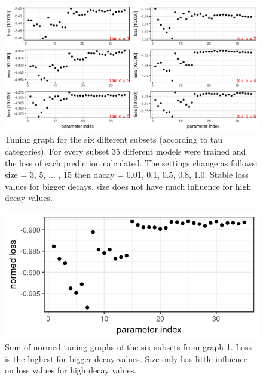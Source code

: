 \documentclass[a4paper,12pt]{article}
\begin{document}
\begin{figure}
 \includegraphics[width=\textwidth]{pictures/nnet_tuning.png}
 \caption{Tuning graph for the six different subsets (according to tau categories). For every subset 35 different models were trained and the loss of each prediction calculated. The settings change as follows: size = 3, 5, ... , 15 then dacay = 0.01, 0.1, 0.5, 0.8, 1.0. Stable loss values for bigger decays, size does not have much influence for high decay values.}
 \label{Figure::ParameterGraph}
\end{figure}

\begin{figure}
  \begin{minipage}[c]{0.65\textwidth}
    \includegraphics[width=\textwidth]{pictures/normed_sum.png}
  \end{minipage}\hfill
  \begin{minipage}[c]{0.35\textwidth}
    \caption{Sum of normed tuning graphs of the six subsets from graph \ref{Figure::ParameterGraph}. Loss is the highest for bigger decay values. Size only has little influence on loss values for high decay values.}
    \label{Figure::NormedSum}
  \end{minipage}
\end{figure}
\end{document}
